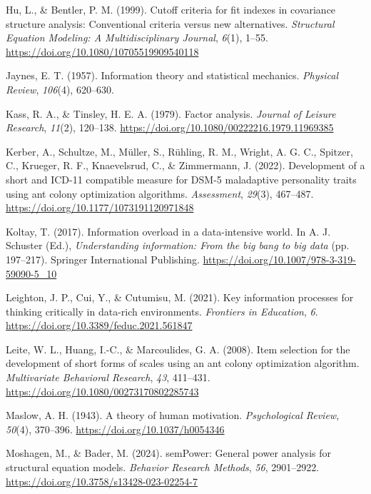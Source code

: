 \documentclass[
  12pt,
  a4paper,
  twoside]{article}
\newlength{\cslhangindent}
\newenvironment{CSLReferences}[2] %
 {\begin{list}{}{%
  \setlength{\itemindent}{0pt}
  \setlength{\leftmargin}{0pt}
  \setlength{\parsep}{0pt}
  \ifodd #1
   \setlength{\leftmargin}{\cslhangindent}
   \setlength{\itemindent}{-1\cslhangindent}
  \fi
  \setlength{\itemsep}{#2\baselineskip}}}
 {\end{list}}
\begin{document}
\begin{CSLReferences}{1}{0}
Hu, L., \& Bentler, P. M. (1999). Cutoff criteria for fit indexes in covariance structure analysis: Conventional criteria versus new alternatives. \emph{Structural Equation Modeling: A Multidisciplinary Journal}, \emph{6}(1), 1--55. \url{https://doi.org/10.1080/10705519909540118}

Jaynes, E. T. (1957). Information theory and statistical mechanics. \emph{Physical Review}, \emph{106}(4), 620--630.

Kass, R. A., \& Tinsley, H. E. A. (1979). Factor analysis. \emph{Journal of Leisure Research}, \emph{11}(2), 120--138. \url{https://doi.org/10.1080/00222216.1979.11969385}

Kerber, A., Schultze, M., Müller, S., Rühling, R. M., Wright, A. G. C., Spitzer, C., Krueger, R. F., Knaevelsrud, C., \& Zimmermann, J. (2022). Development of a short and ICD-11 compatible measure for DSM-5 maladaptive personality traits using ant colony optimization algorithms. \emph{Assessment}, \emph{29}(3), 467--487. \url{https://doi.org/10.1177/1073191120971848}

Koltay, T. (2017). Information overload in a data-intensive world. In A. J. Schuster (Ed.), \emph{Understanding information: From the big bang to big data} (pp. 197--217). Springer International Publishing. \url{https://doi.org/10.1007/978-3-319-59090-5_10}

Leighton, J. P., Cui, Y., \& Cutumisu, M. (2021). Key information processes for thinking critically in data-rich environments. \emph{Frontiers in Education}, \emph{6}. \url{https://doi.org/10.3389/feduc.2021.561847}

Leite, W. L., Huang, I.-C., \& Marcoulides, G. A. (2008). Item selection for the development of short forms of scales using an ant colony optimization algorithm. \emph{Multivariate Behavioral Research}, \emph{43}, 411--431. \url{https://doi.org/10.1080/00273170802285743}

Maslow, A. H. (1943). A theory of human motivation. \emph{Psychological Review}, \emph{50}(4), 370--396. \url{https://doi.org/10.1037/h0054346}

Moshagen, M., \& Bader, M. (2024). semPower: General power analysis for structural equation models. \emph{Behavior Research Methods}, \emph{56}, 2901--2922. \url{https://doi.org/10.3758/s13428-023-02254-7}


\end{CSLReferences}
\end{document}
